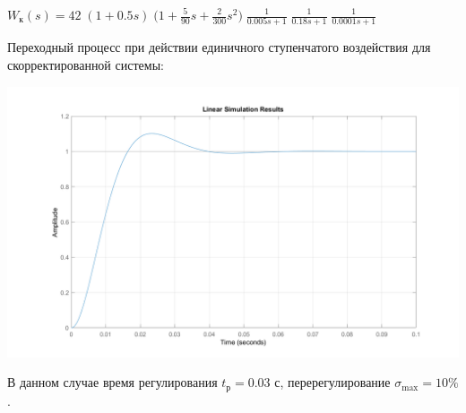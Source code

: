 \documentclass[a4paper,12pt]{article}
\newcommand{\ds}{\displaystyle}
\renewcommand{\^}[2]{#1^{\, #2} \kern -1pt}
\newcommand{\1}{\kern 1pt}
\newcommand{\0}{\kern -1pt}
\begin{document}
	$\ds W_{\text{к}}(s) = 42 \; (1 + 0.5 s) \; \bigg( 1 + \frac{5}{90} s + \frac{2}{300} s^2 \bigg) \; \frac{1}{0.005 s + 1} \; \frac{1}{0.18 s + 1}  \; \frac{1}{0.0001 s + 1}$
	
	\newpage
	
	Переходный процесс при действии единичного ступенчатого воздействия для скорректированной системы:
	
	\includegraphics[scale=0.35,page=1]{ПП_№6(2).png}
	
	В данном случае время регулирования $t_{\text{р}} = 0.03$ с, перерегулирование $\sigma_{\max} = 10 \%$.
	
	
	
\end{document}
